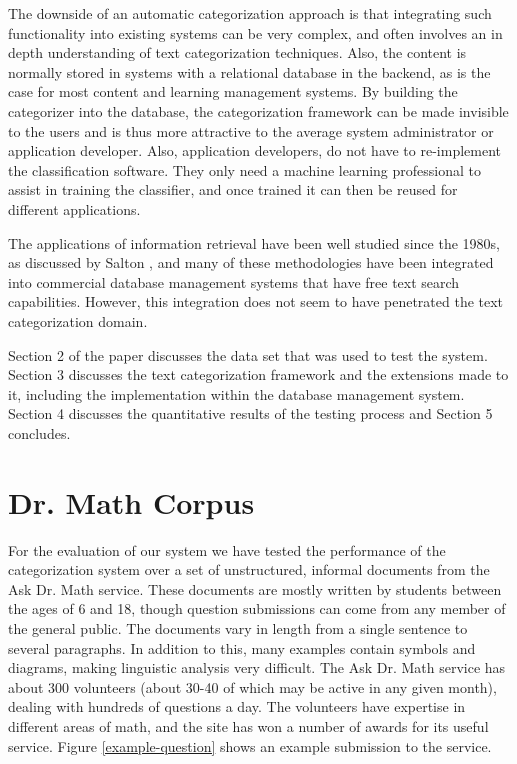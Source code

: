 \documentclass{ios}
\begin{document}
The downside of an automatic categorization approach is that integrating such 
functionality into existing systems can be very complex, and often involves an in 
depth understanding of text categorization techniques.  Also, the content is normally 
stored in systems with a relational database in the backend, as is the case for most 
content and learning management systems. By building the categorizer into the 
database, the categorization framework\cite{williams:02} can be made invisible to the 
users and is thus more attractive to the average system administrator or application 
developer. Also, application developers, do not have to re-implement the 
classification software. They only need a machine learning professional to assist in 
training the classifier, and once trained it can then be reused for different applications. 

The applications of information retrieval have been well studied since the 1980s, as 
discussed by Salton \cite{salton:89,salton:91}, and many of these methodologies have been 
integrated into commercial database management systems that have free text search 
capabilities. However, this integration does not seem to have penetrated the text 
categorization domain.

Section 2 of the paper discusses the data set that was used to test
the system. Section 3 discusses the text categorization framework and
the extensions made to it, including the implementation within the
database management system. Section 4 discusses the quantitative
results of the testing process and Section 5 concludes.

\section{Dr. Math Corpus}
\label{corpus}

For the evaluation of our system we have tested the performance of the
categorization system over a set of unstructured, informal documents
from the Ask Dr. Math service.\cite{drmath} These documents are mostly
written by students between the ages of 6 and 18, though question
submissions can come from any member of the general public.  The documents vary
in length from a single sentence to several paragraphs. In addition to
this, many examples contain symbols and diagrams, making linguistic
analysis very difficult. The Ask Dr. Math service has about 300
volunteers (about 30-40 of which may be active in any given month),
dealing with hundreds of questions a day. The volunteers have
expertise in different areas of math, and the site has won a number of
awards for its useful service.  Figure \ref{example-question} shows an
example submission to the service.
\end{document}
